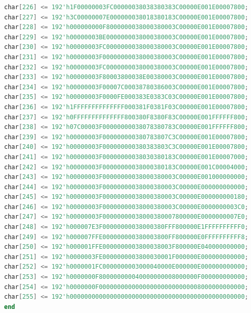 \documentclass[UTF8]{article}
\theoremstyle{MyLineTheoremStyle} %
\theoremstyle{MyBlockTheoremStyle} %
\theoremstyle{MySubsubsectionStyle} %
\begin{document}
\begin{lstlisting}[language=Verilog, caption={小组成员姓名显示Verilog代码修改部分}, label={lst:verilog_code2}]
char[226] <= 192'h1F00000003FC00000038038380383C00000E001E00007800;
char[227] <= 192'h3C00000007E000000038018380183C00000E001E00007800;
char[228] <= 192'h000000000F8000000038000380003C00000E001E00007800;
char[229] <= 192'h00000003BE0000000038000380003C00000E001E00007800;
char[230] <= 192'h00000003FC0000000038000380003C00000E001E00007800;
char[231] <= 192'h00000003F00000000038000380003C00000E001E00007800;
char[232] <= 192'h00000003FC0000000038000380003C00000E001E00007800;
char[233] <= 192'h00000003F80003800038E00380003C00000E001E00007800;
char[234] <= 192'h00000003F00007C00038780386003C00000E001E00007800;
char[235] <= 192'h00000003F0000FE000383E0383C03C00000E001E00007800;
char[236] <= 192'h1FFFFFFFFFFFFFF000381F0381F03C00000E001E00007800;
char[237] <= 192'h0FFFFFFFFFFFFFF800380F8380F83C00000E001FFFFFF800;
char[238] <= 192'h07C00003F00000000038078380783C00000E001FFFFFF800;
char[239] <= 192'h00000003F000000000380783807C3C00000E001E00007800;
char[240] <= 192'h00000003F000000000380383803C3C00000E001E00007800;
char[241] <= 192'h00000003F00000000038030380183C00000E001E00007000;
char[242] <= 192'h00000003F00000000038000380183C00000E001C00004000;
char[243] <= 192'h00000003F00000000038000380003C00000E001000000000;
char[244] <= 192'h00000003F00000000038000380003C00000E000000000000;
char[245] <= 192'h00000003F00000000038000380003C00000E000000000180;
char[246] <= 192'h00000003F00000000038000380003C00000E0000000003C0;
char[247] <= 192'h00000003F00000000038000380007800000E0000000007E0;
char[248] <= 192'h000007E3F00000000038000380FFF800000E1FFFFFFFFFF0;
char[249] <= 192'h000007FFE000000000380003800FF800000E0FFFFFFFFFF8;
char[250] <= 192'h000001FFE0000000003800038003F800000E040000000000;
char[251] <= 192'h0000003FE0000000003800030001F000000E000000000000;
char[252] <= 192'h0000001FC0000000003000040000E000000E000000000000;
char[253] <= 192'h0000000F800000000040000000008000000F000000000000;
char[254] <= 192'h0000000F0000000000000000000000000008000000000000;
char[255] <= 192'h000000000000000000000000000000000000000000000000;
end
\end{lstlisting}
\end{document}
